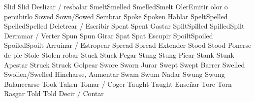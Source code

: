 	            {Slid}{}	            {Slid}{}                {Deslizar / resbalar}{}
	            {Smelt}{Smelled}	    {Smelled}{Smelt}        {Oler}{Emitir olor o percibirlo}
	            {Sowed}{}	            {Sown/Sowed}{}          {Sembrar}{}
	            {Spoke}{}	            {Spoken}{}              {Hablar}{}
	            {Spelt}{Spelled}	    {Spelled}{Spelled}      {Deletrear / Escribir}{}
	            {Spent}{}	            {Spent}{}               {Gastar}{}
	            {Spilt}{Spilled}	    {Spilled}{Spilt}        {Derramar / Verter}{}
	            {Spun}{}	            {Spun}{}                {Girar}{}
	            {Spat}{}	            {Spat}{}                {Escupir}{}
	            {Spoilt}{Spoiled}	    {Spoiled}{Spoilt}       {Arruinar / Estropear}{}
	            {Spread}{}	            {Spread}{}              {Extender}{}
	            {Stood}{}	            {Stood}{}               {Ponerse de pie}{}
	            {Stole}{}	            {Stolen}{}              {robar}{}
	            {Stuck}{}	            {Stuck}{}               {Pegar}{}
	            {Stung}{}	            {Stung}{}               {Picar}{}
	            {Stank}{}	            {Stunk}{}               {Apestar}{}
	            {Struck}{}	            {Struck}{}              {Golpear}{}
	            {Swore}{}	            {Sworn}{}               {Jurar}{}
	            {Swept}{}	            {Swept}{}               {Barrer}{}
	            {Swelled}{}	            {Swollen/Swelled}{}     {Hincharse, Aumentar}{}
	            {Swam}{}	            {Swum}{}                {Nadar}{}
	            {Swung}{}	            {Swung}{}               {Balancearse}{}
	            {Took}{}	            {Taken}{}               {Tomar / Coger}{}
	            {Taught}{}	            {Taught}{}              {Enseñar}{}
	            {Tore}{}	            {Torn}{}                {Rasgar}{}
	            {Told}{}	            {Told}{}                {Decir / Contar}{}

